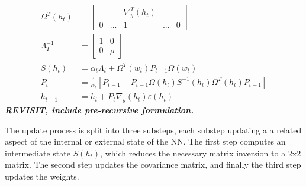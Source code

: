 	\begin{align}
		\Omega^T(h_t) &= \begin{bmatrix}
			&& \nabla_y^T(h_t) && \\ 0 & ... & 1 & ... & 0
		\end{bmatrix} \\
		\Lambda_{T}^{-1} &= \begin{bmatrix}
			1&0\\0&\rho
		\end{bmatrix} \\
		S(h_t) &= \alpha_t\Lambda_t + \Omega^T(w_t)P_{t-1}\Omega(w_t) \\
		P_t &= \frac{1}{\alpha_t}[P_{t-1}-P_{t-1}\Omega(h_t)S^{-1}(h_t)\Omega^T(h_t)P_{t-1}]\\
		h_{t+1} &= h_t + P_t \nabla_y(h_t)\varepsilon(h_t) 
	\end{align}
		\textbf{\textit{REVISIT, include pre-recursive formulation.}}
	\par The update process is split into three substeps, each substep updating a a related aspect of the internal or external state of the NN. The first step computes an intermediate state $S(h_t)$, which reduces the necessary matrix inversion to a 2x2 matrix. The second step updates the covariance matrix, and finally the third step updates the weights. 
